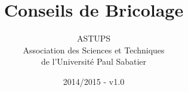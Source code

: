 \documentclass[foldmark,notumble]{leaflet}
\title{Conseils de Bricolage}
\author{ASTUPS\\{\small Association des Sciences et Techniques}\\{\small de l'Université Paul Sabatier}}
\date{2014/2015 - v1.0}
\begin{document}
\thispagestyle{empty}

\maketitle

\newcommand{\tailleRegles}{\large}


\def\tailleImageTournevis{0.7\columnwidth}
\def\formCoefficient{1.0}










\newpage

\end{document}
